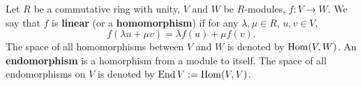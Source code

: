 \begin{definition}
  Let
    $R$ be a commutative ring with unity,
    $V$ and $W$ be $R$-modules,
    $f \colon V \to W$.
  We say that $f$ is \textbf{linear} (or a \textbf{homomorphism}) if for any
  $\lambda, \mu \in R$, $u, v \in V$,
  \begin{equation}
    f(\lambda u + \mu v) = \lambda f(u) + \mu f(v).
  \end{equation}
  The space of all homomorphisms between $V$ and $W$ is denoted by $\mathop{\rm Hom}\nolimits(V, W)$.
  An \textbf{endomorphism} is a homorphism from a module to itself.
  The space of all endomorphisms on $V$ is denoted by $\mathop{\rm End}\nolimits V := \mathop{\rm Hom}\nolimits(V, V)$.
\end{definition}
